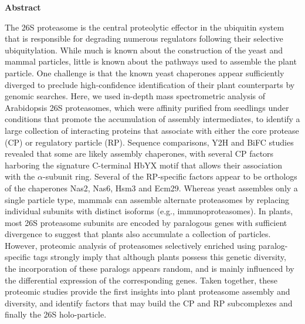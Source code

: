 \textbf{Abstract}

The 26S proteasome is the central proteolytic effector in the ubiquitin system that is responsible for degrading numerous regulators following their selective ubiquitylation.
While much is known about the construction of the yeast and mammal particles, little is known about the pathways used to assemble the plant particle.
One challenge is that the known yeast chaperones appear sufficiently diverged to preclude high-confidence identification of their plant counterparts by genomic searches.
Here, we used in-depth mass spectrometric analysis of Arabidopsis 26S proteasomes, which were affinity purified from seedlings under conditions that promote the accumulation of assembly intermediates, to identify a large collection of interacting proteins that associate with either the core protease (CP) or regulatory particle (RP).
Sequence comparisons, Y2H and BiFC studies revealed that some are likely assembly chaperones, with several CP factors harboring the signature C-terminal HbYX motif that allows their association with the $\alpha$-subunit ring.
Several of the RP-specific factors appear to be orthologs of the chaperones Nas2, Nas6, Hsm3 and Ecm29.
Whereas yeast assembles only a single particle type, mammals can assemble alternate proteasomes by replacing individual subunits with distinct isoforms (e.g., immunoproteasomes).
In plants, most 26S proteasome subunits are encoded by paralogous genes with sufficient divergence to suggest that plants also accumulate a collection of particles.
However, proteomic analysis of proteasomes selectively enriched using paralog-specific tags strongly imply that although plants possess this genetic diversity, the incorporation of these paralogs appears random, and is mainly influenced by the differential expression of the corresponding genes.
Taken together, these proteomic studies provide the first insights into plant proteasome assembly and diversity, and identify factors that may build the CP and RP subcomplexes and finally the 26S holo-particle.